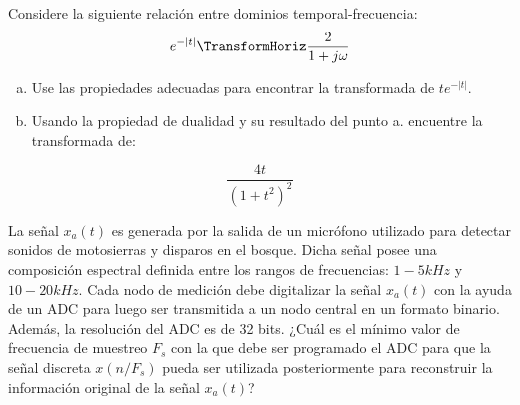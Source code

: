 \begin{ejercicio}
    Considere la siguiente relación entre dominios temporal-frecuencia:
    $$ e^{-|t|} \TransformHoriz \dfrac{2}{1+j\omega}$$
    \begin{enumerate}[a.]
        \item Use las propiedades adecuadas para encontrar la transformada de $te^{-|t|}$.
        \item Usando la propiedad de dualidad y su resultado del punto a. encuentre la transformada de:
    \end{enumerate}
    $$ \dfrac{4t}{(1+t^2)^2} $$
\end{ejercicio}

\begin{ejercicio}
    La señal $x_a(t)$ es generada por la salida de un micrófono utilizado para detectar sonidos de motosierras y disparos en el bosque. Dicha señal posee una composición espectral definida entre los rangos de frecuencias: $1-5kHz$ y $10-20kHz$. Cada nodo de medición debe digitalizar la señal $x_a(t)$ con la ayuda de un ADC para luego ser transmitida a un nodo central en un formato binario. Además, la resolución del ADC es de 32 bits. ¿Cuál es el mínimo valor de frecuencia de muestreo $F_s$ con la que debe ser programado el ADC para que la señal discreta $x(n/F_s)$ pueda ser utilizada posteriormente para reconstruir la información original de la señal $x_a(t)$?
\end{ejercicio}
